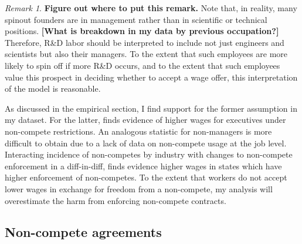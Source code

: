 \documentclass[12pt,english]{article}
\theoremstyle{remark}
\newtheorem{remark}{Remark}
\begin{document}
\begin{remark}
	\textbf{Figure out where to put this remark.}
	Note that, in reality, many spinout founders are in management rather than in scientific or technical positions. \textbf{[What is breakdown in my data by previous occupation?] }Therefore, R\&D labor should be interpreted to include not just engineers and scientists but also their managers. To the extent that such employees are more likely to spin off if more R\&D occurs, and to the extent that such employees value this prospect in deciding whether to accept a wage offer, this interpretation of the model is reasonable. 
	
	As discussed in the empirical section, I find support for the former assumption in my dataset. For the latter, \cite{shi_restrictions_2018} finds evidence of higher wages for executives under non-compete restrictions. An analogous statistic for non-managers is more difficult to obtain due to a lack of data on non-compete usage at the job level. Interacting incidence of non-competes by industry with changes to non-compete enforcement in a diff-in-diff, \cite{starr_consider_2018} finds evidence higher wages in states which have higher enforcement of non-competes. To the extent that workers do not accept lower wages in exchange for freedom from a non-compete, my analysis will overestimate the harm from enforcing non-compete contracts.
\end{remark}

\subsection{Non-compete agreements}
\end{document}
